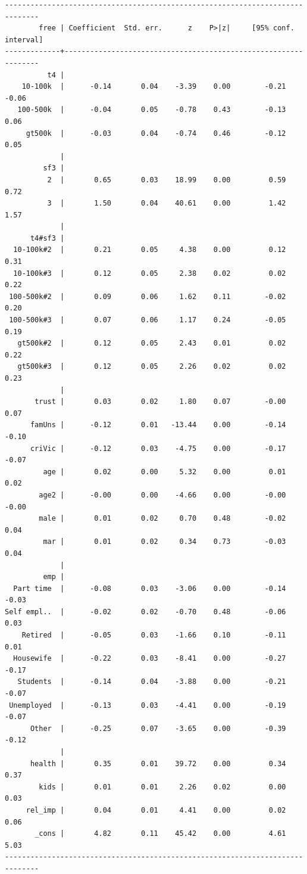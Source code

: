 \documentclass[10pt, letterpaper]{article}
\begin{document}
\begin{spacing}{1.4}
\begin{scriptsize}
\begin{spacing}{.19}
\begin{verbatim}
------------------------------------------------------------------------------
        free | Coefficient  Std. err.      z    P>|z|     [95% conf. interval]
-------------+----------------------------------------------------------------
          t4 |
    10-100k  |      -0.14       0.04    -3.39    0.00        -0.21       -0.06
   100-500k  |      -0.04       0.05    -0.78    0.43        -0.13        0.06
     gt500k  |      -0.03       0.04    -0.74    0.46        -0.12        0.05
             |
         sf3 |
          2  |       0.65       0.03    18.99    0.00         0.59        0.72
          3  |       1.50       0.04    40.61    0.00         1.42        1.57
             |
      t4#sf3 |
  10-100k#2  |       0.21       0.05     4.38    0.00         0.12        0.31
  10-100k#3  |       0.12       0.05     2.38    0.02         0.02        0.22
 100-500k#2  |       0.09       0.06     1.62    0.11        -0.02        0.20
 100-500k#3  |       0.07       0.06     1.17    0.24        -0.05        0.19
   gt500k#2  |       0.12       0.05     2.43    0.01         0.02        0.22
   gt500k#3  |       0.12       0.05     2.26    0.02         0.02        0.23
             |
       trust |       0.03       0.02     1.80    0.07        -0.00        0.07
      famUns |      -0.12       0.01   -13.44    0.00        -0.14       -0.10
      criVic |      -0.12       0.03    -4.75    0.00        -0.17       -0.07
         age |       0.02       0.00     5.32    0.00         0.01        0.02
        age2 |      -0.00       0.00    -4.66    0.00        -0.00       -0.00
        male |       0.01       0.02     0.70    0.48        -0.02        0.04
         mar |       0.01       0.02     0.34    0.73        -0.03        0.04
             |
         emp |
  Part time  |      -0.08       0.03    -3.06    0.00        -0.14       -0.03
Self empl..  |      -0.02       0.02    -0.70    0.48        -0.06        0.03
    Retired  |      -0.05       0.03    -1.66    0.10        -0.11        0.01
  Housewife  |      -0.22       0.03    -8.41    0.00        -0.27       -0.17
   Students  |      -0.14       0.04    -3.88    0.00        -0.21       -0.07
 Unemployed  |      -0.13       0.03    -4.41    0.00        -0.19       -0.07
      Other  |      -0.25       0.07    -3.65    0.00        -0.39       -0.12
             |
      health |       0.35       0.01    39.72    0.00         0.34        0.37
        kids |       0.01       0.01     2.26    0.02         0.00        0.03
     rel_imp |       0.04       0.01     4.41    0.00         0.02        0.06
       _cons |       4.82       0.11    45.42    0.00         4.61        5.03
------------------------------------------------------------------------------


\end{verbatim}
\end{spacing}
\end{scriptsize}
\end{spacing}
\end{document}
